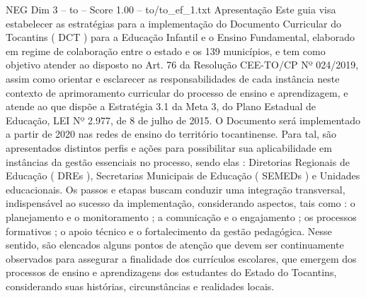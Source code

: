 \begin{textsample}{NEG Dim 3 – to – Score 1.00 – to/to\_ef\_1.txt}  \label{ex:f3_neg_186}
Apresentação Este guia visa estabelecer as estratégias para a implementação do Documento Curricular do Tocantins ( DCT ) para a Educação Infantil e o Ensino Fundamental, elaborado em regime de colaboração entre o estado e os 139 municípios, e tem como objetivo atender ao disposto no Art. 76 da Resolução CEE-TO/CP Nº 024/2019, assim como orientar e esclarecer as responsabilidades de cada instância neste contexto de aprimoramento curricular do processo de ensino e aprendizagem, e atende ao que dispõe a Estratégia 3.1 da Meta 3, do Plano Estadual de Educação, LEI Nº 2.977, de 8 de julho de 2015.
O Documento será implementado a partir de 2020 nas redes de ensino do território tocantinense.
Para tal, são apresentados distintos perfis e ações para possibilitar sua aplicabilidade em instâncias da gestão essenciais no processo, sendo elas : Diretorias Regionais de Educação ( DREs ), Secretarias Municipais de Educação ( SEMEDs ) e Unidades educacionais.
Os passos e etapas buscam conduzir uma integração transversal, indispensável ao sucesso da implementação, considerando aspectos, tais como : o planejamento e o monitoramento ; a comunicação e o engajamento ; os processos formativos ; o apoio técnico e o fortalecimento da gestão pedagógica.
Nesse sentido, são elencados alguns pontos de atenção que devem ser continuamente observados para assegurar a finalidade dos currículos escolares, que emergem dos processos de ensino e aprendizagens dos estudantes do Estado do Tocantins, considerando suas histórias, circunstâncias e realidades locais.

\end{textsample}
